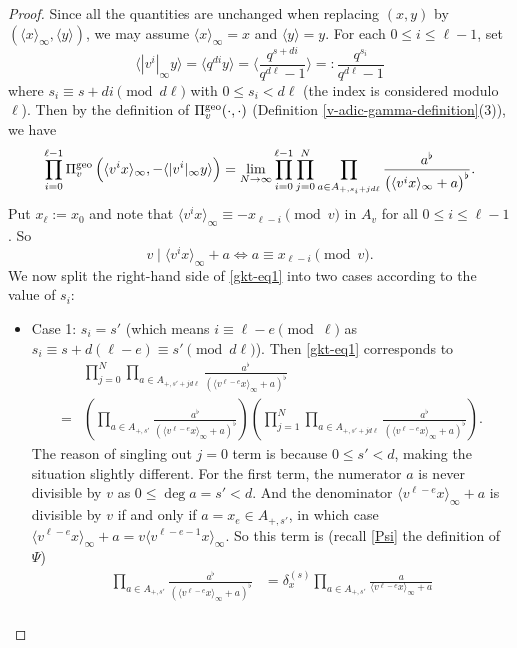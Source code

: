 \documentclass[11pt]{amsart}
\theoremstyle{plain}
\theoremstyle{definition}
\theoremstyle{remark}
\numberwithin{equation}{section}
\newcommand{\ang}[1]{\langle #1 \rangle}
\newcommand{\anginf}[1]{\langle #1 \rangle_\infty}
\newcommand{\vgf}{\Pi_v^{\textnormal{geo}}}
\let\l\ell
\begin{document}
	\begin{proof}
		Since all the quantities are unchanged when replacing $(x,y)$ by $(\anginf{x},\ang{y})$, we may assume $\anginf{x} = x$ and $\ang{y} = y$.
		For each $0 \leq i \leq \l-1$, set
		$$
		\ang{|v^i|_\infty y}
		= \ang{q^{di}y}
		= \ang{\frac{q^{s+di}}{q^{d\l}-1}}
		=: \frac{q^{s_i}}{q^{d\l}-1}
		$$
		where $s_i \equiv s+di \pmod{d\l}$ with $0 \leq s_i < d\l$ (the index is considered modulo $\l$).
		Then by the definition of $\vgf(\cdot,\cdot)$ (Definition \ref{v-adic-gamma-definition}(3)), we have
		\begin{equation}   \label{gkt-eq1}
			\prod_{i=0}^{\l-1} \vgf \left( \anginf{v^ix}, -\ang{|v^i|_\infty y} \right)
			= \lim_{N\to\infty}  \prod_{i=0}^{\l-1} \prod_{j=0}^N  \prod_{a \in A_{+,s_i+jd\l}} \frac{a^\flat}{\left(\anginf{v^ix}+a\right)^\flat}.       
		\end{equation}
		Put $x_\l := x_0$ and note that $\anginf{v^ix} \equiv -x_{\l-i} \pmod{v}$ in $A_v$ for all $0\leq i \leq \l-1$.
		So
		$$
		v \mid \anginf{v^ix} + a
		\iff a \equiv x_{\l-i} \pmod{v}.
		$$
		We now split the right-hand side of \eqref{gkt-eq1} into two cases according to the value of $s_i$:
		\begin{itemize}
			\item Case 1:
			$s_i = s'$ (which means $i \equiv \l-e \pmod{\l}$ as $s_i \equiv s+d(\l-e) \equiv s' \pmod{d\l}$).
			Then \eqref{gkt-eq1} corresponds to
			\begin{align}
				&\prod_{j=0}^N  \prod_{a \in A_{+,s'+jd\l}} \frac{a^\flat}{\left(\anginf{v^{\l-e} x}+a \right)^\flat}     \nonumber     \\
				={} &\left( \prod_{a \in A_{+,s'}} \frac{a^\flat}{\left(\anginf{v^{\l-e} x}+a\right)^\flat} \right)
				\left( \prod_{j=1}^N  \prod_{a \in A_{+,s'+jd\l}} \frac{a^\flat}{\left(\anginf{v^{\l-e} x}+a\right)^\flat} \right).     \label{gkt-case1}
			\end{align}
			The reason of singling out $j=0$ term is because $0 \leq s' <d$, making the situation slightly different.
			For the first term, the numerator $a$ is never divisible by $v$ as $0 \leq \deg a = s' < d$.
			And the denominator $\anginf{v^{\l-e} x}+a$ is divisible by $v$ if and only if $a = x_e \in A_{+,s'}$, in which case $\anginf{v^{\l-e} x} + a = v\anginf{v^{\l-e-1}x}$.
			So this term is (recall \eqref{Psi} the definition of $\Psi$)
			\begin{align*}
				\prod_{a \in A_{+,s'}} \frac{a^\flat}{\left(\anginf{v^{\l-e} x}+a\right)^\flat}
				&= \delta_x^{(s)}
				\prod_{a \in A_{+,s'}} 	\frac{a}{\anginf{v^{\l-e} x}+a}   \\

\end{align*}
\end{itemize}
\end{proof}
\end{document}

